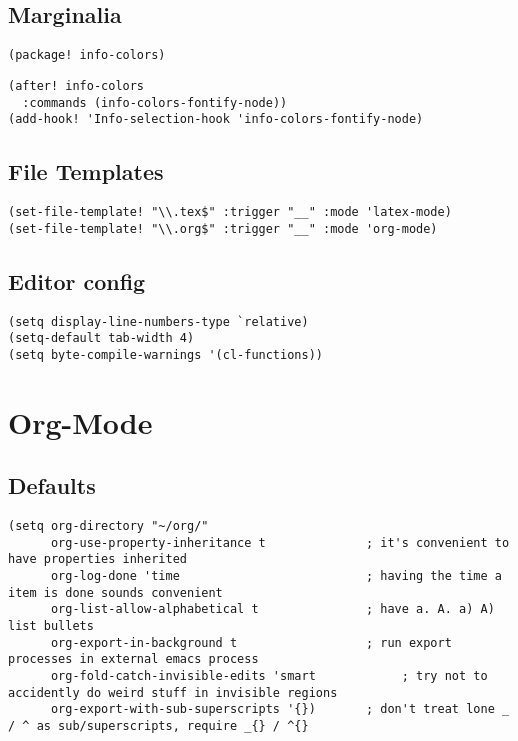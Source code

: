 \documentclass[c]{article}
\theoremstyle{plain}%
\theoremstyle{definition}
\theoremstyle{remark}
\begin{document}
\subsection{Marginalia}
\label{sec:org05b7323}
\begin{verbatim}
(package! info-colors)
\end{verbatim}
\begin{verbatim}
(after! info-colors
  :commands (info-colors-fontify-node))
(add-hook! 'Info-selection-hook 'info-colors-fontify-node)
\end{verbatim}
\subsection{File Templates}
\label{sec:org6e2fe82}
\begin{verbatim}
(set-file-template! "\\.tex$" :trigger "__" :mode 'latex-mode)
(set-file-template! "\\.org$" :trigger "__" :mode 'org-mode)
\end{verbatim}
\subsection{Editor config}
\label{sec:org786f569}
\begin{verbatim}
(setq display-line-numbers-type `relative)
(setq-default tab-width 4)
(setq byte-compile-warnings '(cl-functions))
\end{verbatim}
\section{Org-Mode}
\label{sec:org3a2b2a4}
\subsection{Defaults}
\label{sec:org4e993dd}
\begin{verbatim}
(setq org-directory "~/org/"
      org-use-property-inheritance t              ; it's convenient to have properties inherited
      org-log-done 'time                          ; having the time a item is done sounds convenient
      org-list-allow-alphabetical t               ; have a. A. a) A) list bullets
      org-export-in-background t                  ; run export processes in external emacs process
      org-fold-catch-invisible-edits 'smart            ; try not to accidently do weird stuff in invisible regions
      org-export-with-sub-superscripts '{})       ; don't treat lone _ / ^ as sub/superscripts, require _{} / ^{}
\end{verbatim}
\end{document}
